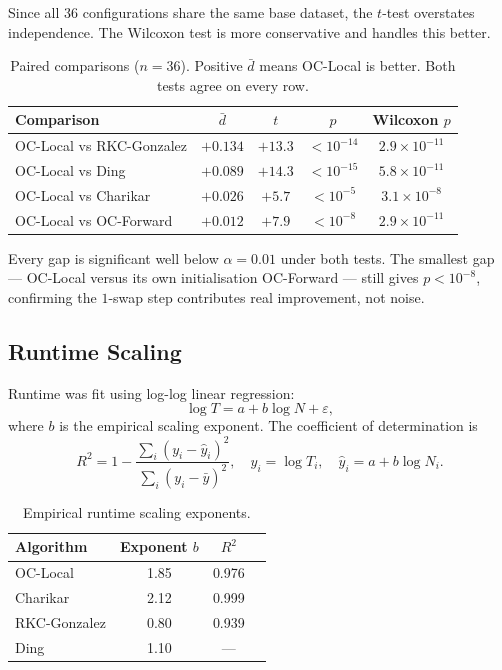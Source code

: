 \documentclass[11pt]{article}
\begin{document}
Since all 36 configurations share the same base dataset, the $t$-test overstates independence. The Wilcoxon test is more conservative and handles this better.

\begin{table}[H]
\centering
\begin{tabular}{lcccc}
\toprule
Comparison & $\bar{d}$ & $t$ & $p$ & Wilcoxon $p$ \\
\midrule
OC-Local vs RKC-Gonzalez & $+0.134$ & $+13.3$ & $<10^{-14}$ & $2.9\times10^{-11}$ \\
OC-Local vs Ding         & $+0.089$ & $+14.3$ & $<10^{-15}$ & $5.8\times10^{-11}$ \\
OC-Local vs Charikar     & $+0.026$ & $+5.7$  & $<10^{-5}$  & $3.1\times10^{-8}$ \\
OC-Local vs OC-Forward   & $+0.012$ & $+7.9$  & $<10^{-8}$  & $2.9\times10^{-11}$ \\
\bottomrule
\end{tabular}
\caption{Paired comparisons ($n=36$). Positive $\bar{d}$ means OC-Local is better.
Both tests agree on every row.}
\end{table}

Every gap is significant well below $\alpha = 0.01$ under both tests. The smallest gap --- OC-Local versus its own initialisation OC-Forward --- still gives $p < 10^{-8}$, confirming the $1$-swap step contributes real improvement, not noise.

\subsection{Runtime Scaling}

Runtime was fit using log-log linear regression:
\[
\log T = a + b \log N + \varepsilon,
\]
where $b$ is the empirical scaling exponent. The coefficient of determination is
\[
R^2 = 1 - \frac{\sum_i (y_i - \hat{y}_i)^2}{\sum_i (y_i - \bar{y})^2},
\quad y_i = \log T_i,\quad \hat{y}_i = a + b\log N_i.
\]

\begin{table}[H]
\centering
\begin{tabular}{lccc}
\toprule
Algorithm & Exponent $b$ & $R^2$ \\
\midrule
OC-Local     & 1.85 & 0.976 \\
Charikar     & 2.12 & 0.999 \\
RKC-Gonzalez & 0.80 & 0.939 \\
Ding         & 1.10 & --- \\
\bottomrule
\end{tabular}
\caption{Empirical runtime scaling exponents.}
\end{table}
\end{document}
